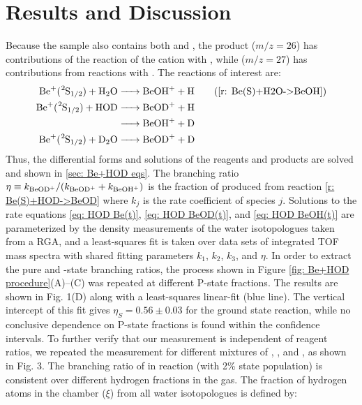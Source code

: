 \section{Results and Discussion}

Because the  sample also contains both  and , the product  ($m/z = 26$) has contributions of the reaction of the cation with , while  ($m/z = 27$) has contributions from reactions with . The reactions of interest are:
\begin{align}
	\ce{Be+(^2S1/2) + H2O & -> BeOH+ + H} \tag{\ref{r: Be(S)+H2O->BeOH}} \\
	\ce{Be+(^2S1/2) + HOD & -> BeOD+ + H} \label{r: Be(S)+HOD->BeOD} \\
	\ce{& -> BeOH+ + D} \label{r: Be(S)+HOD->BeOH} \\
	\ce{Be+(^2S1/2) + D2O & -> BeOD+ + D} \label{r: Be(S)+D2O->BeOD}
\end{align}
Thus, the differential forms and solutions of the reagents and products are solved and shown in \ref{sec: Be+HOD eqs}. The branching ratio $\eta \equiv k_{\ce{BeOD+}}/(k_{\ce{BeOD+}} + k_{\ce{BeOH+}})$ is the fraction of  produced from reaction \ref{r: Be(S)+HOD->BeOD} where $k_j$ is the rate coefficient of species $j$. Solutions to the rate equations \ref{eq: HOD Be(t)}, \ref{eq: HOD BeOD(t)}, and \ref{eq: HOD BeOH(t)} are parameterized by the density measurements of the water isotopologues taken from a RGA, and a least-squares fit is taken over data sets of integrated TOF mass spectra with shared fitting parameters $k_1$, $k_2$, $k_3$, and $\eta$. In order to extract the pure  and -state branching ratios, the process shown in Figure \ref{fig: Be+HOD procedure}(A)–(C) was repeated at different P-state fractions. The results are shown in Fig. 1(D) along with a least-squares linear-fit (blue line). The vertical intercept of this fit gives $\eta_S = 0.56 \pm 0.03$ for the ground  state reaction, while no conclusive dependence on P-state fractions is found within the confidence intervals. To further verify that our measurement is independent of reagent ratios, we repeated the measurement for different mixtures of , , and , as shown in Fig. 3. The branching ratio of  in reaction  (with 2\%  state population) is consistent over different hydrogen fractions in the gas. The fraction of hydrogen atoms in the chamber ($\xi$) from all water isotopologues is defined by:
